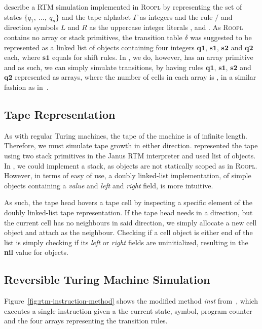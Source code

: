 \citeauthor{th:roopl} describe a RTM simulation implemented in \textsc{Roopl} by representing the set of states $\{q_1,\ \dots,\ q_n\}$ and the tape alphabet $\Gamma$ as integers and the rule $/$ and direction symbols $L$ and $R$ as the uppercase integer literals ,  and . As \textsc{Roopl} contains no array or stack primitives, the transition table $\delta$ was suggested to be represented as a linked list of objects containing four integers ${\textbf{q1}}$, ${\textbf{s1}}$, ${\textbf{s2}}$ and ${\textbf{q2}}$ each, where ${\textbf{s1}}$ equals  for shift rules. In \rooplpp, we do, however, has an array primitive and as such, we can simply simulate transitions, by having rules ${\textbf{q1}}$, ${\textbf{s1}}$, ${\textbf{s2}}$ and ${\textbf{q2}}$ represented as arrays, where the number of cells in each array is , in a similar fashion as in~\cite{ty:ejanus}.

\subsection{Tape Representation}
\label{subsec:tape-representation}
As with regular Turing machines, the tape of the machine is of infinite length. Therefore, we must simulate tape growth in either direction.
\citeauthor{ty:ejanus} represented the tape using two stack primitives in the Janus RTM interpreter and \citeauthor{th:roopl} used list of objects. In \rooplpp, we could implement a stack, as objects are not statically scoped as in \textsc{Roopl}. However, in terms of easy of use, a doubly linked-list implementation, of simple objects containing a \textit{value} and \textit{left} and \textit{right} field, is more intuitive.

As such, the tape head hovers a tape cell by inspecting a specific element of the doubly linked-list tape representation. If the tape head needs in a direction, but the current cell has no neighbours in said direction, we simply allocate a new cell object and attach as the neighbour. Checking if a cell object is either end of the list is simply checking if its \textit{left} or \textit{right} fields are uninitialized, resulting in the \textbf{nil} value for objects.  

\subsection{Reversible Turing Machine Simulation}
\label{subsec:rtm-simulation}
Figure~\ref{fig:rtm-instruction-method} shows the modified method \textit{inst} from~\cite{ty:ejanus}, which executes a single instruction given a the current state, symbol, program counter and the four arrays representing the transition rules. 

